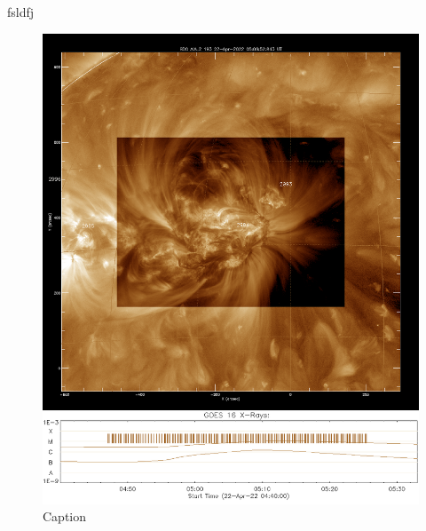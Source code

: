     fsldfj
    \begin{figure}[H]
        \centering
        \includegraphics[width = 12cm]{report/Figures/results/aia_Mclass_2204.png}
        \caption{Caption}
        \label{Mclass_flare}
    \end{figure}

    